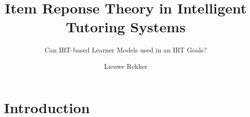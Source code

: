 \documentclass{scrartcl}
\providecommand{\comm}[1]{{\bf[ #1 ]}}
\providecommand{\commd}[1]{\comm{D: {#1}}}
\begin{document}
 
\title{Item Reponse Theory in Intelligent Tutoring Systems}
\subtitle{Can IRT-based Learner Models used in an IRT Goals?}

\author{Lieuwe Rekker}
\maketitle
\nocite{labelcombi}
\nocite{lftransfer}
\nocite{importance}
\nocite{knowledgeproblem}
\nocite{modelreview}
\nocite{eirt}
\nocite{pfa}
\nocite{ktpfa}
\nocite{skillcombi}
\nocite{lfa}
\nocite{blackart}
\nocite{hambleton}
\nocite{bridge}
\nocite{ct}
\nocite{algebra}


\section{Introduction}

\end{document}
